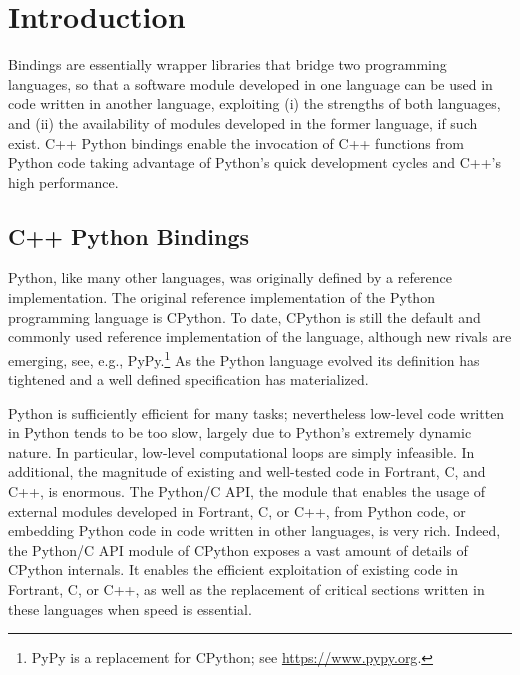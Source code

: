 \section{Introduction}
\label{sec:intro}
Bindings are essentially wrapper libraries that bridge two
programming languages, so that a software module developed in one
language can be used in code written in another language, exploiting
(i) the strengths of both languages, and (ii) the availability of
modules developed in the former language, if such exist. C++ Python
bindings enable the invocation of C++ functions from Python code
taking advantage of Python's quick development cycles and C++'s high
performance.
%
\subsection{C++ Python Bindings}
\label{ssec:intro:bind}
Python, like many other languages, was originally defined by a
reference implementation. The original reference implementation of the
Python programming language is CPython. To date, CPython is still the
default and commonly used reference implementation of the language,
although new rivals are emerging, see, e.g., PyPy.\footnote{PyPy is a
  replacement for CPython; see \url{https://www.pypy.org}.} As the
Python language evolved its definition has tightened and a well
defined specification has materialized.

Python is sufficiently efficient for many tasks; nevertheless
low-level code written in Python tends to be too slow, largely due to
Python's extremely dynamic nature. In particular, low-level
computational loops are simply infeasible. In additional, the
magnitude of existing and well-tested code in Fortrant, C, and C++, is
enormous. The Python/C API, the module that enables the usage of
external modules developed in Fortrant, C, or C++, from Python code,
or embedding Python code in code written in other languages, is very
rich.  Indeed, the Python/C API module of CPython exposes a vast
amount of details of CPython internals. It enables the efficient
exploitation of existing code in Fortrant, C, or C++, as well as the
replacement of critical sections written in these languages when speed
is essential.

